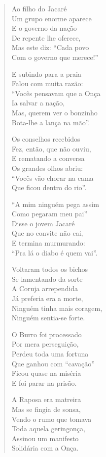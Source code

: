 \begin{verse}
Ao filho do Jacaré\\
Um grupo enorme aparece\\
E o governo da nação\\
De repente lhe oferece,\\
Mas este diz: “Cada povo\\
Com o governo que merece!”


E subindo para a praia\\
Falou com muita razão:\\
“Vocês pensavam que a Onça\\
Ia salvar a nação,\\
Mas, querem ver o bonzinho\\
Bota-lhe a lança na mão”.

Os conselhos recebidos\\
Fez, então, que não ouviu,\\
E rematando a conversa\\
Os grandes olhos abriu:\\
“Vocês vão chorar na cama\\
Que ficou dentro do rio”.

“A mim ninguém pega assim\\
Como pegaram meu pai”\\
Disse o jovem Jacaré\\
Que no convite não cai,\\
E termina murmurando:\\
“Pra lá o diabo é quem vai”.

Voltaram todos os bichos\\
Se lamentando da sorte\\
A Coruja arrependida\\
Já preferia era a morte,\\
Ninguém tinha mais coragem,\\
Ninguém sentia-se forte.


O Burro foi processado\\
Por mera perseguição,\\
Perdeu toda uma fortuna\\
Que ganhou com “cavação”\\
Ficou quase na miséria\\
E foi parar na prisão.

A Raposa era matreira\\
Mas se fingia de sonsa,\\
Vendo o rumo que tomava\\
Toda aquela geringonça,\\
Assinou um manifesto\\
Solidária com a Onça.


\end{verse}
